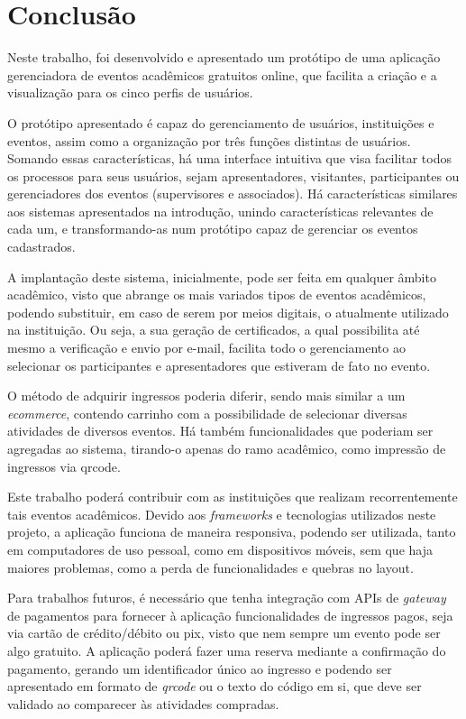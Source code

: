 \chapter{Conclusão}\label{chp:LABEL_CHP_6}

Neste trabalho, foi desenvolvido e apresentado um protótipo de uma aplicação gerenciadora de eventos acadêmicos gratuitos online, que facilita a criação e a visualização para os cinco perfis de usuários.

O protótipo apresentado é capaz do gerenciamento de usuários, instituições e eventos, assim como a organização por três funções distintas de usuários. Somando essas características, há uma interface intuitiva que visa facilitar todos os processos para seus usuários, sejam apresentadores, visitantes, participantes ou gerenciadores dos eventos (supervisores e associados). Há características similares aos sistemas apresentados na introdução, unindo características relevantes de cada um, e transformando-as num protótipo capaz de gerenciar os eventos cadastrados.

A implantação deste sistema, inicialmente, pode ser feita em qualquer âmbito acadêmico, visto que abrange os mais variados tipos de eventos acadêmicos, podendo substituir, em caso de serem por meios digitais, o atualmente utilizado na instituição. Ou seja, a sua geração de certificados, a qual possibilita até mesmo a verificação e envio por e-mail, facilita todo o gerenciamento ao selecionar os participantes e apresentadores que estiveram de fato no evento.

O método de adquirir ingressos poderia diferir, sendo mais similar a um \textit{ecommerce}, contendo carrinho com a possibilidade de selecionar diversas atividades de diversos eventos. Há também funcionalidades que poderiam ser agregadas ao sistema, tirando-o apenas do ramo acadêmico, como impressão de ingressos via qrcode. 

Este trabalho poderá contribuir com as instituições que realizam recorrentemente tais eventos acadêmicos. Devido aos \textit{frameworks} e tecnologias utilizados neste projeto, a aplicação funciona de maneira responsiva, podendo ser utilizada, tanto em computadores de uso pessoal, como em dispositivos móveis, sem que haja maiores problemas, como a perda de funcionalidades e quebras no layout.

Para trabalhos futuros, é necessário que tenha integração com APIs de \textit{gateway} de pagamentos para fornecer à aplicação funcionalidades de ingressos pagos, seja via cartão de crédito/débito ou pix, visto que nem sempre um evento pode ser algo gratuito. A aplicação poderá fazer uma reserva mediante a confirmação do pagamento, gerando um identificador único ao ingresso e podendo ser apresentado em formato de \textit{qrcode} ou o texto do código em si, que deve ser validado ao comparecer às atividades compradas. 

